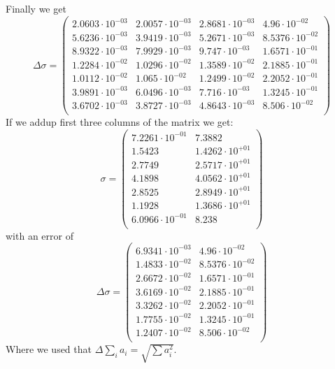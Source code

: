 \documentclass[]{article}
\begin{document}
Finally we get
\begin{equation}
\Delta\sigma=\begin{pmatrix}
   2.0603\cdot 10^{-03} & 2.0057\cdot 10^{-03} & 2.8681\cdot 10^{-03} & 4.96\cdot 10^{-02} \\
   5.6236\cdot 10^{-03} & 3.9419\cdot 10^{-03} & 5.2671\cdot 10^{-03} & 8.5376\cdot 10^{-02} \\
   8.9322\cdot 10^{-03} & 7.9929\cdot 10^{-03} & 9.747\cdot 10^{-03} & 1.6571\cdot 10^{-01} \\
   1.2284\cdot 10^{-02} & 1.0296\cdot 10^{-02} & 1.3589\cdot 10^{-02} & 2.1885\cdot 10^{-01} \\
   1.0112\cdot 10^{-02} & 1.065\cdot 10^{-02} & 1.2499\cdot 10^{-02} & 2.2052\cdot 10^{-01} \\
   3.9891\cdot 10^{-03} & 6.0496\cdot 10^{-03} & 7.716\cdot 10^{-03} & 1.3245\cdot 10^{-01} \\
   3.6702\cdot 10^{-03} & 3.8727\cdot 10^{-03} & 4.8643\cdot 10^{-03} & 8.506\cdot 10^{-02} \\
\end{pmatrix}
\end{equation}
If we addup first three columns of the matrix we get:
\begin{equation}
\sigma=
\begin{pmatrix}
   7.2261\cdot 10^{-01} & 7.3882 \\
   1.5423 & 1.4262\cdot 10^{+01} \\
   2.7749 & 2.5717\cdot 10^{+01} \\
   4.1898 & 4.0562\cdot 10^{+01} \\
   2.8525 & 2.8949\cdot 10^{+01} \\
   1.1928 & 1.3686\cdot 10^{+01} \\
   6.0966\cdot 10^{-01} & 8.238 \\
\end{pmatrix}
\end{equation}
with an error of
\begin{equation}
\Delta\sigma=
\begin{pmatrix}
   6.9341\cdot 10^{-03} & 4.96\cdot 10^{-02} \\
   1.4833\cdot 10^{-02} & 8.5376\cdot 10^{-02} \\
   2.6672\cdot 10^{-02} & 1.6571\cdot 10^{-01} \\
   3.6169\cdot 10^{-02} & 2.1885\cdot 10^{-01} \\
   3.3262\cdot 10^{-02} & 2.2052\cdot 10^{-01} \\
   1.7755\cdot 10^{-02} & 1.3245\cdot 10^{-01} \\
   1.2407\cdot 10^{-02} & 8.506\cdot 10^{-02} \\
\end{pmatrix}
\end{equation}
Where we used that $\Delta\sum_i a_i=\sqrt{\sum a_i^2}$.

\pagebreak
\nocite{*}
\printbibliography
\end{document}
